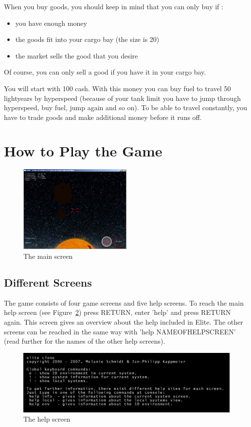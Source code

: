 \documentclass[a4paper,11pt]{article}
\begin{document}
When you buy goods, you should keep in mind that you can only buy if :
\begin{itemize}
\item you have enough money
\item the goods fit into your cargo bay (the size is 20)
\item the market sells the good that you desire
\end{itemize}

Of course, you can only sell a good if you have it in your cargo bay.

You will start with 100 cash. With this money you can buy fuel to travel 50 lightyears by hyperspeed (because of your tank limit you have to jump through hyperspeed, buy fuel, jump again and so on). To be able to travel constantly, you have to trade goods and make additional money before it runs off.

\section{How to Play the Game}

\begin{figure}[ht]
	\centering
		\includegraphics[width=0.50\textwidth]{mainscreen.jpg}
		\caption{The main screen\label{mainscreen}}
\end{figure}

\subsection{Different Screens}
The game consists of four game screens and five help screens. To reach the main help screen (see Figure~\ref{helpscreen}) press \textsc{RETURN}, enter 'help' and press \textsc{RETURN} again. This screen gives an overview about the help included in Elite. The other screens can be reached in the same way with 'help \textsc{NAMEOFHELPSCREEN}' (read further for the names of the other help screens).

\begin{figure}[htbp]
	\centering
		\includegraphics[width=1.00\textwidth]{helpscreen.jpg}
		\caption{The help screen\label{helpscreen}}
\end{figure}
\end{document}
